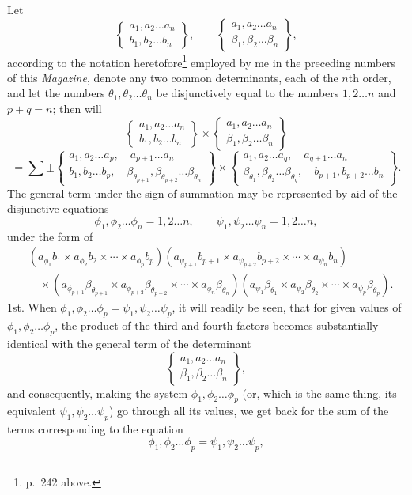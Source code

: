 \documentclass[11pt]{article}
\newcommand{\bd}[2]{\left\{\begin{matrix}#1\\#2\end{matrix}\right\}}
\begin{document}
{{Let
\[
\bd{a_1,a_2\ldots a_n}{b_1,b_2\ldots b_n},
\qquad
\bd{a_1,a_2\ldots a_n}{\beta_1,\beta_2\ldots\beta_n},
\]
according to the notation heretofore\footnote{p.~242 above.} employed by me in the preceding numbers of this \emph{Magazine}, denote any two common determinants, each of the $n$th order, and let the numbers $\theta_1,\theta_2\ldots\theta_n$ be disjunctively equal to the numbers $1,2\ldots n$ and $p+q=n$; then will
\[
\bd{a_1,a_2\ldots a_n}{b_1,b_2\ldots b_n}
\times
\bd{a_1,a_2\ldots a_n}{\beta_1,\beta_2\ldots\beta_n}
\]
\[
=\sum\pm
\bd{a_1,a_2\ldots a_p,\quad a_{p+1}\ldots a_n}{b_1,b_2\ldots b_p,\quad \beta_{\theta_{p+1}},\beta_{\theta_{p+2}}\ldots\beta_{\theta_n}}
\times
\bd{a_1,a_2\ldots a_q,\quad a_{q+1}\ldots a_n}{\beta_{\theta_1},\beta_{\theta_2}\ldots\beta_{\theta_q},\quad b_{p+1},b_{p+2}\ldots b_n}.
\]
The general term under the sign of summation may be represented by aid of the disjunctive equations
\[
\phi_1,\phi_2\ldots\phi_n=1,2\ldots n,
\qquad
\psi_1,\psi_2\ldots\psi_n=1,2\ldots n,
\]
under the form of
\[
\begin{aligned}
& (a_{\phi_1}b_1\times a_{\phi_2}b_2\times\cdots\times a_{\phi_p}b_p)
(a_{\psi_{p+1}}b_{p+1}\times a_{\psi_{p+2}}b_{p+2}\times\cdots\times a_{\psi_n}b_n)\\
&\quad\times(a_{\phi_{p+1}}\beta_{\theta_{p+1}}\times a_{\phi_{p+2}}\beta_{\theta_{p+2}}\times\cdots\times a_{\phi_n}\beta_{\theta_n})
(a_{\psi_1}\beta_{\theta_1}\times a_{\psi_2}\beta_{\theta_2}\times\cdots\times a_{\psi_p}\beta_{\theta_p}).
\end{aligned}
\]
1st. When $\phi_1,\phi_2\ldots\phi_p=\psi_1,\psi_2\ldots\psi_p$, it will readily be seen, that for given values of $\phi_1,\phi_2\ldots\phi_p$, the product of the third and fourth factors becomes substantially identical with the general term of the determinant
\[
\bd{a_1,a_2\ldots a_n}{\beta_1,\beta_2\ldots\beta_n},
\]
and consequently, making the system $\phi_1,\phi_2\ldots\phi_p$ (or, which is the same thing, its equivalent $\psi_1,\psi_2\ldots\psi_p$) go through all its values, we get back for the sum of the terms corresponding to the equation
\[
\phi_1,\phi_2\ldots\phi_p=\psi_1,\psi_2\ldots\psi_p,
\]

}}
\end{document}
